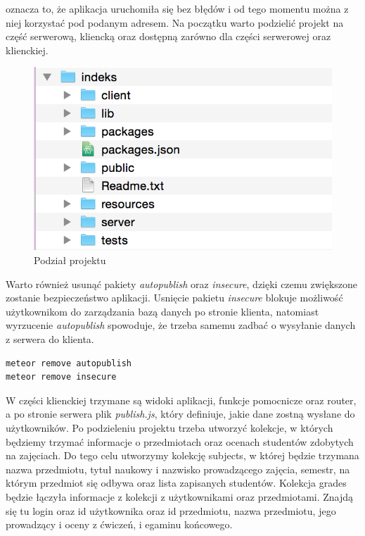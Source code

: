 \documentclass{xmgr}
\begin{document}
\noindent oznacza to, że aplikacja uruchomiła się bez błędów i od tego momentu można z niej korzystać pod podanym adresem. Na początku warto podzielić projekt na część serwerową, kliencką oraz dostępną zarówno dla części serwerowej oraz klienckiej.

\begin{figure}[H]
\centering
\includegraphics[width=0.75\hsize]{images/splitProject}
\caption{Podział projektu\label{RYS.17}}
\end{figure}

Warto również usunąć pakiety \textit{autopublish} oraz \textit{insecure}, dzięki czemu zwiększone zostanie bezpieczeństwo aplikacji. Usnięcie pakietu \textit{insecure} blokuje możliwość użytkownikom do zarządzania bazą danych po stronie klienta, natomiast wyrzucenie \textit{autopublish} spowoduje, że trzeba samemu zadbać o wysyłanie danych z serwera do klienta.\cite{DiscoverMeteor2013}

\begin{lstlisting}[language=bash,caption={Usuwanie pakietów}]
meteor remove autopublish
meteor remove insecure
\end{lstlisting}

W części klienckiej trzymane są widoki aplikacji, funkcje pomocnicze oraz router, a po stronie serwera plik \textit{publish.js}, który definiuje, jakie dane zostną wysłane do użytkowników. Po podzieleniu projektu trzeba utworzyć kolekcje, w których będziemy trzymać informacje o przedmiotach oraz ocenach studentów zdobytych na zajęciach. Do tego celu utworzymy kolekcję subjects, w której będzie trzymana nazwa przedmiotu, tytuł naukowy i nazwisko prowadzącego zajęcia, semestr, na którym przedmiot się odbywa oraz lista zapisanych studentów. Kolekcja grades będzie łączyła informacje z kolekcji z użytkownikami oraz przedmiotami. Znajdą się tu login oraz id użytkownika oraz id przedmiotu, nazwa przedmiotu, jego prowadzący i oceny z ćwiczeń, i egaminu końcowego.
\end{document}
